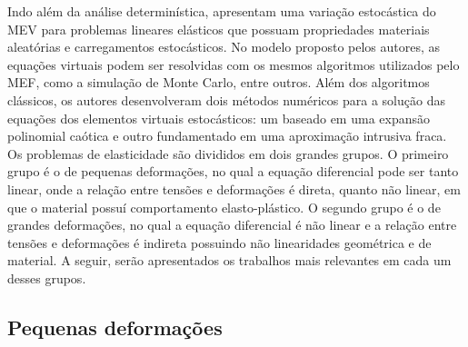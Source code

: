 \indent Indo além da análise determinística, \citet{stochasticvirtualelementmethodsuncertaintypropagationstochasticlinearelasticity2024} apresentam uma variação estocástica do MEV para problemas lineares elásticos que possuam propriedades materiais aleatórias e carregamentos estocásticos. No modelo proposto pelos autores, as equações virtuais podem ser resolvidas com os mesmos algoritmos utilizados pelo MEF, como a simulação de Monte Carlo, entre outros. Além dos algoritmos clássicos, os autores desenvolveram dois métodos numéricos para a solução das equações dos elementos virtuais estocásticos: um baseado em uma expansão polinomial caótica e outro fundamentado em uma aproximação intrusiva fraca. \\
\indent Os problemas de elasticidade são divididos em dois grandes grupos. O primeiro grupo é o de pequenas deformações, no qual a equação diferencial pode ser tanto linear, onde a relação entre tensões e deformações é direta, quanto não linear, em que o material possuí comportamento elasto-plástico. O segundo grupo é o de grandes deformações, no qual a equação diferencial é não linear e a relação entre tensões e deformações é indireta possuindo não linearidades geométrica e de material. A seguir, serão apresentados os trabalhos mais relevantes em cada um desses grupos. \\

\subsection{Pequenas deformações}

